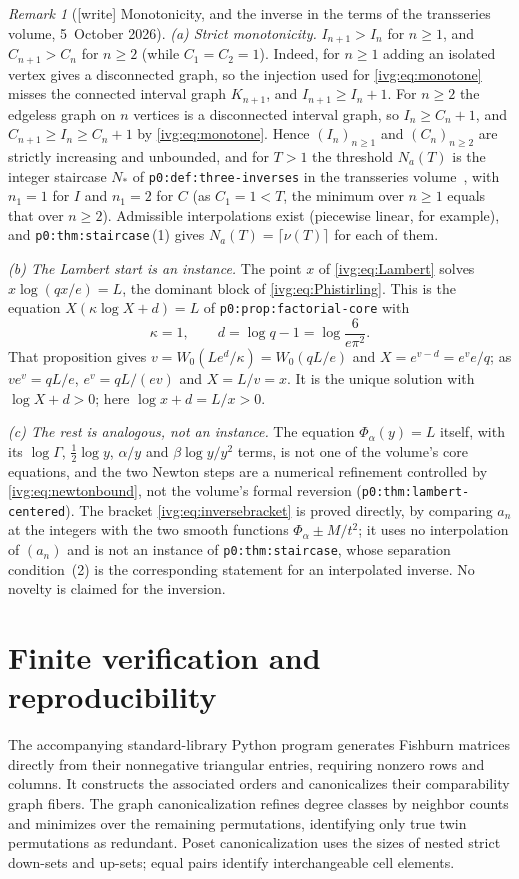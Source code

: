\documentclass[11pt,letterpaper]{article}
\theoremstyle{definition}\newtheorem{definition}[theorem]{Definition}
\theoremstyle{remark}\newtheorem{remark}[theorem]{Remark}
\newcommand{\file}[1]{\nolinkurl{#1}}
\begin{document}
\begin{remark}[{[write]} Monotonicity, and the inverse in the terms of the transseries volume, 5~October 2026]\label{ivg:rem:lambert}
\emph{(a) Strict monotonicity.} $I_{n+1}>I_n$ for $n\ge1$, and
$C_{n+1}>C_n$ for $n\ge2$ (while $C_1=C_2=1$). Indeed, for $n\ge1$ adding an
isolated vertex gives a disconnected graph, so the injection used for
\eqref{ivg:eq:monotone} misses the connected interval graph $K_{n+1}$, and
$I_{n+1}\ge I_n+1$. For $n\ge2$ the edgeless graph on $n$ vertices is a
disconnected interval graph, so $I_n\ge C_n+1$, and
$C_{n+1}\ge I_n\ge C_n+1$ by \eqref{ivg:eq:monotone}. Hence $(I_n)_{n\ge1}$
and $(C_n)_{n\ge2}$ are strictly increasing and unbounded, and for $T>1$ the
threshold $N_a(T)$ is the integer staircase $N_\ast$ of
\file{p0:def:three-inverses} in the transseries volume~\cite{TSvol}, with
$n_1=1$ for $I$ and $n_1=2$ for $C$ (as $C_1=1<T$, the minimum over $n\ge1$
equals that over $n\ge2$). Admissible interpolations exist (piecewise linear,
for example), and \file{p0:thm:staircase}\,(1) gives
$N_a(T)=\lceil\nu(T)\rceil$ for each of them.

\emph{(b) The Lambert start is an instance.} The point $x$ of
\eqref{ivg:eq:Lambert} solves $x\log(qx/e)=L$, the dominant block of
\eqref{ivg:eq:Phistirling}. This is the equation
$X(\kappa\log X+d)=L$ of \file{p0:prop:factorial-core} with
\[
 \kappa=1,\qquad d=\log q-1=\log\frac6{e\pi^2}.
\]
That proposition gives $v=W_0(Le^{d}/\kappa)=W_0(qL/e)$ and
$X=e^{v-d}=e^{v}e/q$; as $ve^{v}=qL/e$, $e^{v}=qL/(ev)$ and $X=L/v=x$. It is
the unique solution with $\log X+d>0$; here $\log x+d=L/x>0$.

\emph{(c) The rest is analogous, not an instance.} The equation
$\Phi_\alpha(y)=L$ itself, with its $\log\Gamma$, $\tfrac12\log y$, $\alpha/y$
and $\beta\log y/y^2$ terms, is not one of the volume's core equations, and
the two Newton steps are a numerical refinement controlled by
\eqref{ivg:eq:newtonbound}, not the volume's formal reversion
(\file{p0:thm:lambert-centered}). The bracket \eqref{ivg:eq:inversebracket}
is proved directly, by comparing $a_n$ at the integers with the two smooth
functions $\Phi_\alpha\pm M/t^2$; it uses no interpolation of $(a_n)$ and is
not an instance of \file{p0:thm:staircase}, whose separation condition~(2) is
the corresponding statement for an interpolated inverse. No novelty is
claimed for the inversion.
\end{remark}

\section{Finite verification and reproducibility}\label{ivg:sec:checks}
The accompanying standard-library Python program generates Fishburn matrices directly from their nonnegative triangular entries, requiring nonzero rows and columns. It constructs the associated orders and canonicalizes their comparability graph fibers. The graph canonicalization refines degree classes by neighbor counts and minimizes over the remaining permutations, identifying only true twin permutations as redundant. Poset canonicalization uses the sizes of nested strict down-sets and up-sets; equal pairs identify interchangeable cell elements.
\end{document}
